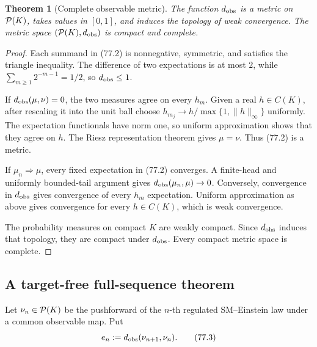 \documentclass[11pt]{article}
\newtheorem{theorem}{Theorem}[section]
\theoremstyle{remark}
\begin{document}
\begin{theorem}[Complete observable metric]
\label{thm:v12v77-metric}
The function \(d_{\rm obs}\) is a metric on
\({\cal P}(K)\), takes values in \([0,1]\), and induces the topology
of weak convergence.  The metric space
\(({\cal P}(K),d_{\rm obs})\) is compact and complete.
\end{theorem}

\begin{proof}
Each summand in (77.2) is nonnegative, symmetric, and satisfies the
triangle inequality.  The difference of two expectations is at most
\(2\), while
\(\sum_{m\geq1}2^{-m-1}=1/2\), so \(d_{\rm obs}\leq1\).

If \(d_{\rm obs}(\mu,\nu)=0\), the two measures agree on every
\(h_m\).  Given a real \(h\in C(K)\), after rescaling it into the
unit ball choose \(h_{m_j}\to h/\max\{1,\|h\|_\infty\}\)
uniformly.  The expectation functionals have norm one, so uniform
approximation shows that they agree on \(h\).  The Riesz
representation theorem gives \(\mu=\nu\).  Thus (77.2) is a metric.

If \(\mu_n\Rightarrow\mu\), every fixed expectation in (77.2)
converges.  A finite-head and uniformly bounded-tail argument gives
\(d_{\rm obs}(\mu_n,\mu)\to0\).  Conversely, convergence in
\(d_{\rm obs}\) gives convergence of every \(h_m\) expectation.
Uniform approximation as above gives convergence for every
\(h\in C(K)\), which is weak convergence.

The probability measures on compact \(K\) are weakly compact.
Since \(d_{\rm obs}\) induces that topology, they are compact under
\(d_{\rm obs}\).  Every compact metric space is complete.
\end{proof}

\subsection{A target-free full-sequence theorem}

Let \(\nu_n\in{\cal P}(K)\) be the pushforward of the \(n\)-th
regulated SM--Einstein law under a common observable map.  Put
\begin{equation}
                         e_n:=
 d_{\rm obs}(\nu_{n+1},\nu_n).                               \tag{77.3}
\end{equation}
\end{document}
